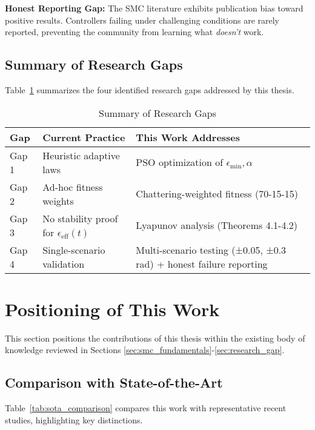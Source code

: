 \textbf{Honest Reporting Gap:} The SMC literature exhibits publication bias toward positive results. Controllers failing under challenging conditions are rarely reported, preventing the community from learning what \emph{doesn't} work.

\subsection{Summary of Research Gaps}

Table~\ref{tab:research_gaps} summarizes the four identified research gaps addressed by this thesis.

\begin{table}[t]
\centering
\caption{Summary of Research Gaps}
\label{tab:research_gaps}
\begin{tabular}{p{3cm}p{5cm}p{5cm}}
\toprule
\textbf{Gap} & \textbf{Current Practice} & \textbf{This Work Addresses} \\
\midrule
Gap 1 & Heuristic adaptive laws & PSO optimization of $\epsilon_{\min}, \alpha$ \\
Gap 2 & Ad-hoc fitness weights & Chattering-weighted fitness (70-15-15) \\
Gap 3 & No stability proof for $\epsilon_{\text{eff}}(t)$ & Lyapunov analysis (Theorems 4.1-4.2) \\
Gap 4 & Single-scenario validation & Multi-scenario testing (±0.05, ±0.3 rad) + honest failure reporting \\
\bottomrule
\end{tabular}
\end{table}

\section{Positioning of This Work}
\label{sec:positioning}

This section positions the contributions of this thesis within the existing body of knowledge reviewed in Sections \ref{sec:smc_fundamentals}-\ref{sec:research_gap}.

\subsection{Comparison with State-of-the-Art}

Table~\ref{tab:sota_comparison} compares this work with representative recent studies, highlighting key distinctions.

